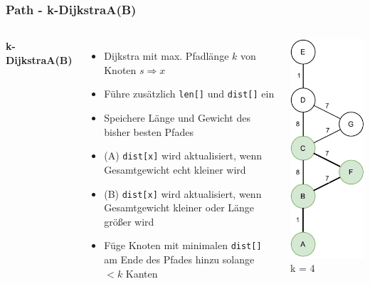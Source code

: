 \documentclass[aspectratio=169]{beamer}
\begin{document}
\begin{frame}
	\frametitle{Path - k-DijkstraA(B)}
	\begin{columns}[c] %
		
		\textbf{k-DijkstraA(B)}
		\begin{itemize}
			\item Dijkstra mit max. Pfadlänge $k$ von Knoten $s \Rightarrow x$
			\item Führe zusätzlich \texttt{len[]} und \texttt{dist[]} ein
			\item Speichere Länge und Gewicht des bisher besten Pfades
			\item (A) \texttt{dist[x]} wird aktualisiert, wenn Gesamtgewicht echt kleiner wird
			\item (B) \texttt{dist[x]} wird aktualisiert, wenn Gesamtgewicht kleiner oder Länge größer wird
			\item Füge Knoten mit minimalen \texttt{dist[]} am Ende des Pfades hinzu solange $<k$ Kanten
		\end{itemize}
		\includegraphics[scale=.6]{path_dijkstraAB.pdf}
		k = 4\\
		
		
	\end{columns}
	\end{frame}
	
\end{document}
